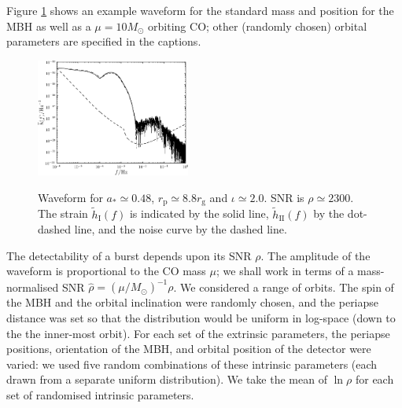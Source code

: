 \documentclass[11pt,twoside]{article}
\begin{document}
Figure \ref{fig:Examples} shows an example waveform for the standard mass and position for the MBH as well as a $\mu = 10 M_\odot$ orbiting CO; other (randomly chosen) orbital parameters are specified in the captions.
\begin{figure}
  \begin{center}
  \includegraphics[width=0.45\textwidth]{Fig_new_sph_h_254}
\label{fig:Examples}
\caption{Waveform for $a_\ast \simeq 0.48$, $r_\mathrm{p} \simeq 8.8 r_\mathrm{g}$ and $\iota \simeq 2.0$. SNR is $\rho \simeq 2300$. The strain $\widetilde{h}_\mathrm{I}(f)$ is indicated by the solid line, $\widetilde{h}_\mathrm{II}(f)$ by the dot-dashed line, and the noise curve by the dashed line.}
  \end{center}
\end{figure}

The detectability of a burst depends upon its SNR $\rho$. The amplitude of the waveform is proportional to the CO mass $\mu$; we shall work in terms of a mass-normalised SNR $\hat{\rho} = (\mu/M_\odot)^{-1}\rho$. We considered a range of orbits. The spin of the MBH and the orbital inclination were randomly chosen, and the periapse distance was set so that the distribution would be uniform in log-space (down to the the inner-most orbit). For each set of the extrinsic parameters, the periapse positions, orientation of the MBH, and orbital position of the detector were varied: we used five random combinations of these intrinsic parameters (each drawn from a separate uniform distribution). We take the mean of $\ln \rho$ for each set of randomised intrinsic parameters.
\end{document}
